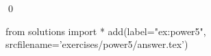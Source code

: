 
\begin{ex} 
  \label{ex:power5}
  
  \qed
\end{ex} 
\begin{python0}
from solutions import *
add(label="ex:power5",
    srcfilename='exercises/power5/answer.tex') 
\end{python0}
